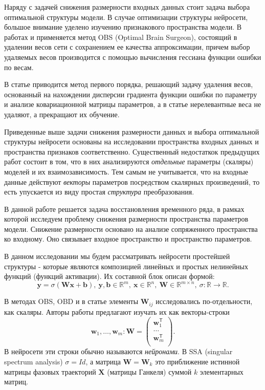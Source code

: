 \documentclass[12pt, twoside]{article}
\begin{document}
Наряду с задачей снижения размерности входных данных стоит задача выбора оптимальной структуры модели. В случае оптимизации структуры нейросети, большое внимание уделено изучению признакового пространства модели. В работах \citep{hassibi1993optimal} и \citep{dong2017learning} применяется метод OBS (Optimal Brain Surgeon), состоящий в удалении весов сети с сохранением ее качества аппроксимации, причем выбор удаляемых весов производится с помощью вычисления гессиана функции ошибки по весам.

В статье \citep{grabovoy2019def} приводится метод первого порядка, решающий задачу удаления весов, основанный на нахождении дисперсии градиента функции ошибки по параметру и анализе ковариационной матрицы параметров, а в статье \citep{grabovoy2020intro} нерелевантные веса не удаляют, а прекращают их обучение.


Приведенные выше задачи снижения размерности данных и выбора оптимальной структуры нейросети основаны на исследовании пространства входных данных и пространства признаков соответственно. Существенный недостаткок предыдущих работ состоит в том, что в них анализируются \textit{отдельные} параметры (скаляры) моделей и их взаимозависимость. Тем самым не учитывается, что на входные данные действуют \textit{векторы} параметров посредством скалярных произведений, то есть упускается из виду простая \textit{структура} преобразования.

В данной работе решается задача восстановления временного ряда, в рамках которой исследуем проблему снижения размерности пространства параметров модели. Снижение размерности основано на анализе сопряженного пространства ко входному. Оно связывает входное пространство и пространство параметров. 


В данном исследовании мы будем рассматривать нейросети простейшей структуры - которые являются композицией линейных и простых нелинейных функций (функций активации). Их составной блок описан формой:  \[\mathbf{y}=\sigma(\mathbf{W}\mathbf{x} + \mathbf{b}), \ \mathbf{y}, \mathbf{b} \in \mathbb{R}^m, \ \mathbf{x} \in \mathbb{R}^n, \ \mathbf{W} \in \mathbb{R}^{m \times n}, \ \sigma: \mathbb{R} \to \mathbb{R}.\] 

В методах OBS, OBD и в статье \citep{grabovoy2019def} элементы $\mathbf{W}_{ij}$ исследовались по-отдельности, как скаляры. Авторы работы предлагают изучать их как векторы-строки \[\mathbf{w}_1, \dots, \mathbf{w}_m: \mathbf{W} = \begin{pmatrix}
\mathbf{w}_1^{\mathsf{T}}\\
\dots\\
\mathbf{w}_m^{\mathsf{T}}\\
\end{pmatrix}.\] В нейросети эти строки обычно называются \textit{нейронами}. В SSA (singular spectrum analysis) $\sigma = Id$, а матрица $\mathbf{W}=\mathbf{W}_k$ это приближение истинной матрицы фазовых траекторий $\mathsf{\mathbf{X}}$ (матрицы Ганкеля) суммой $k$ элементарных матриц.
\end{document}
